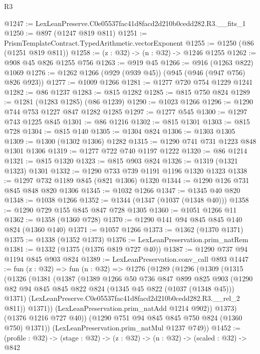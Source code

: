 \begin{lexlean}{R3}
\begin{coremodule}
@1247 := LexLeanPreserve.C0e05537fac41d8facd2d210b0cedd282.R3.__fits_1
@1250 := @897 (@1247 @819 @811)
@1251 := PrismTemplateContract.TypedArithmetic.vectorExponent
@1255 := @1250 (@86 (@1251 @819 @811))
@1258 := (z : @32) -> (n : @32) -> @1246 @1255
@1262 := @908 @45 @826 @1255 @756
@1263 := @919 @45
@1266 := @916 (@1263 @822) @1069
@1276 := @1262 @1266 (@929 (@939 @45)) (@945 (@946 (@947 @756) @826 @923))
@1277 := @1009 @1266
@1281 := @1277 @720 @754 @1229 @1241
@1282 := @86 @1237
@1283 := @815 @1282
@1285 := @815 @750 @824
@1289 := @1281 (@1283 @1285) (@86 @1239)
@1290 := @1023 @1266
@1296 := @1290 @744 @753 @1227 @847 @1282 @1285
@1297 := @1277 @545
@1300 := @1297 @743 @1225 @845
@1301 := @86 @1216
@1302 := @815 @1301
@1303 := @815 @728
@1304 := @815 @140
@1305 := @1304 @824
@1306 := @1303 @1305
@1309 := @1300 (@1302 @1306) @1282
@1315 := @1290 @741 @731 @1223 @848 @1301 @1306
@1319 := @1277 @722 @740 @1197 @1222
@1320 := @86 @1214
@1321 := @815 @1320
@1323 := @815 @903 @824
@1326 := @1319 (@1321 @1323) @1301
@1332 := @1290 @733 @739 @1191 @1196 @1320 @1323
@1338 := @1297 @732 @1189 @845 (@821 @1306) @1320
@1344 := @1290 @126 @731 @845 @848 @820 @1306
@1345 := @1032 @1266
@1347 := @1345 @40 @820
@1348 := @1038 @1266
@1352 := @1344 (@1347 (@1037 (@1348 @40)))
@1358 := @1290 @729 @155 @845 @847 @728 @1305
@1360 := @1051 @1266 @11
@1362 := @1358 (@1360 @728)
@1370 := @1290 @141 @94 @845 @845 @140 @824 (@1360 @140)
@1371 := @1057 @1266
@1373 := @1362 (@1370 @1371)
@1375 := @1338 (@1352 @1373)
@1376 := LexLeanPreservation.prim_natRem
@1381 := @1332 (@1375 (@1376 @819 @727 @40))
@1387 := @1290 @737 @94 @1194 @845 @903 @824
@1389 := LexLeanPreservation.conv_call @893
@1447 := fun (z : @32) =>
  fun (n : @32) =>
  @1276
    (@1289
      (@1296
        (@1309
          (@1315
            (@1326
              (@1381
                (@1387
                  (@1389
                    @1266
                    @50
                    @736
                    @847
                    @899
                    @825
                    @903
                    (@1290 @82 @94 @845 @845 @822 @824 (@1345 @45 @822 (@1037 (@1348 @45))) @1371)
                    (LexLeanPreserve.C0e05537fac41d8facd2d210b0cedd282.R3.__rel_2 @811))
                  @1371))
              (LexLeanPreservation.prim_natAdd @1214 @902))
            @1373)
          (@1376 @1216 @727 @40))
        (@1290 @751 @94 @845 @845 @750 @824 (@1360 @750) @1371))
      (LexLeanPreservation.prim_natMul @1237 @749))
@1452 := (profile : @32) -> (stage : @32) -> (z : @32) -> (n : @32) -> (scaled : @32) -> @842

\end{coremodule}
\end{lexlean}
